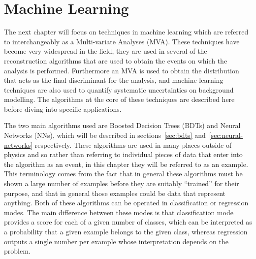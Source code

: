 \chapter{Machine Learning}%
\label{ch:ml}

The next chapter will focus on techniques in machine learning which are referred
to interchangeably as a Multi-variate Analyses (MVA). These techniques have
become very widespread in the field, they are used in several of the
reconstruction algorithms that are used to obtain the events on which the
analysis is performed. Furthermore an MVA is used to obtain the distribution
that acts as the final discriminant for the analysis, and machine learning
techniques are also used to quantify systematic uncertainties on background
modelling. The algorithms at the core of these techniques are described here
before diving into specific applications.

The two main algorithms used are Boosted Decision Trees (BDTs) and Neural
Networks (NNs), which will be described in sections~\ref{sec:bdts}
and~\ref{sec:neural-networks} respectively. These algorithms are used in many
places outside of physics and so rather than referring to individual pieces of
data that enter into the algorithm as an event, in this chapter they will be
referred to as an example. This terminology comes from the fact that in
general these algorithms must be shown a large number of examples before they
are suitably ``trained'' for their purpose, and that in general those examples
could be data that represent anything. Both of these algorithms can be operated
in classification or regression modes. The main difference between these modes
is that classification mode provides a score for each of a given number of
classes, which can be interpreted as a probability that a given example belongs
to the given class, whereas regression outputs a single number per example whose
interpretation depends on the problem.

